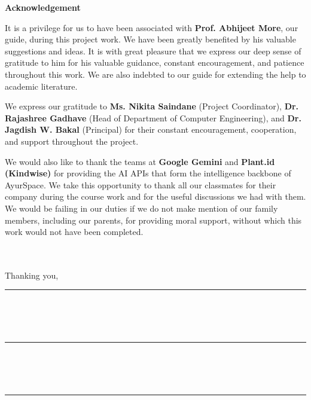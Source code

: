 \documentclass[12pt]{article}
\begin{document}
\justifying
\noindent
\begin{center}
  {\Large \textbf{Acknowledgement}}\\[0.6cm]
\end{center}
\justifying

It is a privilege for us to have been associated with \textbf{Prof. Abhijeet More}, our guide, during
this project work. We have been greatly benefited by his valuable suggestions and ideas. It is
with great pleasure that we express our deep sense of gratitude to him for his valuable guidance,
constant encouragement, and patience throughout this work. We are also indebted to our guide for
extending the help to academic literature.

We express our gratitude to \textbf{Ms. Nikita Saindane} (Project Coordinator),
\textbf{Dr. Rajashree Gadhave} (Head of Department of Computer Engineering),
and \textbf{Dr. Jagdish W. Bakal} (Principal) for their constant encouragement, cooperation, and
support throughout the project.

We would also like to thank the teams at \textbf{Google Gemini} and \textbf{Plant.id (Kindwise)} for
providing the AI APIs that form the intelligence backbone of AyurSpace. We take this opportunity
to thank all our classmates for their company during the course work and for the useful discussions
we had with them. We would be failing in our duties if we do not make mention of our family
members, including our parents, for providing moral support, without which this work would not
have been completed.

\\
\\
Thanking you,
\vspace{1cm}

\begin{flushright}
    \rule{6cm}{0.5pt} \\[-0.4cm]\\[0.1cm]
     \\[1cm]
    \rule{6cm}{0.5pt} \\[-0.4cm]\\[0.1cm]
     \\[1cm]
    \rule{6cm}{0.5pt} \\[-0.4cm]\\[0.1cm]
     \\
\end{flushright}
\end{document}
